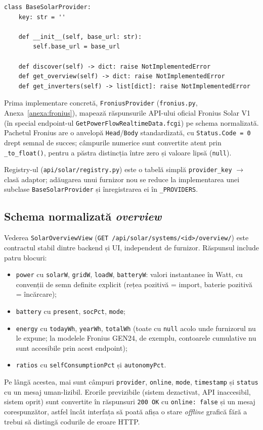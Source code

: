 \begin{verbatim}
class BaseSolarProvider:
    key: str = ''

    def __init__(self, base_url: str):
        self.base_url = base_url

    def discover(self) -> dict: raise NotImplementedError
    def get_overview(self) -> dict: raise NotImplementedError
    def get_inverters(self) -> list[dict]: raise NotImplementedError
\end{verbatim}

Prima implementare concretă, \texttt{FroniusProvider} (\texttt{fronius.py}, Anexa~\ref{anexa:fronius}), mapează răspunsurile API-ului oficial Fronius Solar V1 \cite{fronius_solar_api} (în special endpoint-ul \texttt{GetPowerFlowRealtimeData.fcgi}) pe schema normalizată. Pachetul Fronius are o anvelopă \texttt{Head}/\texttt{Body} standardizată, cu \texttt{Status.Code = 0} drept semnal de succes; câmpurile numerice sunt convertite atent prin \texttt{\_to\_float()}, pentru a păstra distincția între zero și valoare lipsă (\texttt{null}).

Registry-ul (\texttt{api/solar/registry.py}) este o tabelă simplă \texttt{provider\_key} $\to$ clasă adaptor; adăugarea unui furnizor nou se reduce la implementarea unei subclase \texttt{BaseSolarProvider} și înregistrarea ei în \texttt{\_PROVIDERS}.

\subsection{Schema normalizată \emph{overview}}
Vederea \texttt{SolarOverviewView} (\texttt{GET /api/solar/systems/<id>/overview/}) este contractul stabil dintre backend și UI, independent de furnizor. Răspunsul include patru blocuri:
\begin{itemize}
    \item \texttt{power} cu \texttt{solarW}, \texttt{gridW}, \texttt{loadW}, \texttt{batteryW}: valori instantanee în Watt, cu convenții de semn definite explicit (rețea pozitivă = import, baterie pozitivă = încărcare);
    \item \texttt{battery} cu \texttt{present}, \texttt{socPct}, \texttt{mode};
    \item \texttt{energy} cu \texttt{todayWh}, \texttt{yearWh}, \texttt{totalWh} (toate cu \texttt{null} acolo unde furnizorul nu le expune; la modelele Fronius GEN24, de exemplu, contoarele cumulative nu sunt accesibile prin acest endpoint);
    \item \texttt{ratios} cu \texttt{selfConsumptionPct} și \texttt{autonomyPct}.
\end{itemize}
Pe lângă acestea, mai sunt câmpuri \texttt{provider}, \texttt{online}, \texttt{mode}, \texttt{timestamp} și \texttt{status} cu un mesaj uman-lizibil. Erorile previzibile (sistem dezactivat, API inaccesibil, sistem oprit) sunt convertite în răspunsuri \texttt{200 OK} cu \texttt{online: false} și un mesaj corespunzător, astfel încât interfața să poată afișa o stare \emph{offline} grafică fără a trebui să distingă codurile de eroare HTTP.

